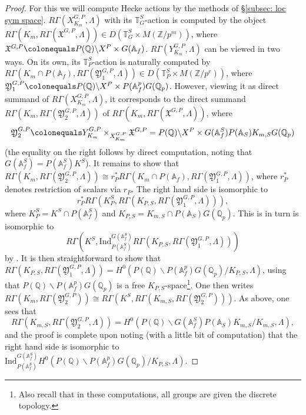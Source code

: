 \documentclass{amsart}
\theoremstyle{remark}
\numberwithin{equation}{subsection}
\newcommand{\A}{\AA}
\newcommand{\Q}{\QQ}
\newcommand{\Z}{\ZZ}
\renewcommand{\AA}{{\mathbb A}}
\newcommand{\QQ}{{\mathbb Q}}
\newcommand{\ZZ}{{\mathbb Z}}
\newcommand{\frakX}{\mathfrak{X}}
\newcommand{\Qp}{\Q_p}
\newcommand{\XGP}[1][m]{X^{G,P}_{K_{#1}}}
\newcommand{\YGP}[1][m]{Y^{G,P}_{K_{#1}}}
\newcommand{\mf}{\mathfrak}
\newcommand{\defeq}{\colonequals}
\renewcommand{\(}{\left(}
\renewcommand{\)}{\right)}
\begin{document}
\begin{proof}
For this we will compute Hecke actions by the methods of \S \ref{subsec: loc sym space}. $R\Gamma(\XGP,\Lambda)$ with its $\mathbb{T}_G^S$-action is computed by the object $R\Gamma(K_m, R\Gamma(\frakX^{G,P},\Lambda))\in D(\mathbb{T}_G^S \times M(\Z/p^m))$, where $\frakX^{G,P} \defeq P(\Q)\backslash X^P \times G(\A_f)$. $R\Gamma(\YGP,\Lambda)$ can be viewed in two ways. On its own, its $\mathbb{T}_P^S$-action is naturally computed by $R\Gamma(K_m\cap P(\A_f), R\Gamma(\mf{Y}_1^{G,P},\Lambda))\in D(\mathbb{T}_P^S \times M(\Z/p^r))$, where $\mf{Y}_1^{G,P} \defeq P(\Q)\backslash X^P \times P(\A_f^p)G(\Qp)$. However, viewing it as direct summand of $R\Gamma(\XGP,\Lambda)$, it corresponds to the direct summand $R\Gamma(K_m, R\Gamma(\mf{Y}_2^{G,P},\Lambda))$ of $R\Gamma(K_m, R\Gamma(\frakX^{G,P},\Lambda))$, where 
\[
\mf{Y}_2^{G,P} \defeq \YGP \times_{\XGP} \mf{X}^{G,P} = P(\Q) \backslash X^P \times G(\A_f^S)P(\A_S)K_{m,S} G(\Qp)
\]
(the equality on the right follows by direct computation, noting that $G(\A_f^S)=P(\A_f^S)K^S$). It remains to show that $R\Gamma(K_m, R\Gamma(\mf{Y}_2^{G,P},\Lambda))\cong r_P^\ast R\Gamma(K_m\cap P(\A_f), R\Gamma(\mf{Y}_1^{G,P},\Lambda))$, where $r_P^\ast$ denotes restriction of scalars via $r_P$. The right hand side is isomorphic to 
\[
r_P^\ast R\Gamma\left( K_P^S, R\Gamma \left( K_{P,S}, R\Gamma(\mf{Y}_1^{G,P},\Lambda)\right) \right),
\]
where $K_P^S = K^S \cap P(\A_f^S)$ and $K_{P,S} = K_{m,S} \cap P(\A_S)G(\Qp)$. This is in turn is isomorphic to 
\[
R\Gamma\left( K^S, \mathrm{Ind}_{P(\A_f^S)}^{G(\A_f^S)} R\Gamma \left( K_{P,S}, R\Gamma(\mf{Y}_1^{G,P},\Lambda)\right) \right)
\]
by \cite[Corollary 2.6]{newton-thorne}. It is then straightforward to show that $R\Gamma(K_{P,S},R\Gamma(\mf{Y}_1^{G,P},\Lambda)) = H^0(P(\Q)\backslash P(\A_f^p)G(\Qp)/K_{P,S}, \Lambda)$, using that $P(\Q)\backslash P(\A_f^p)G(\Qp)$ is a free $K_{P,S}$-space\footnote{Also recall that in these computations, all groups are given the discrete topology.}. One then writes $R\Gamma(K_m, R\Gamma(\mf{Y}_2^{G,P})) \cong R\Gamma(K^S, R\Gamma(K_{m,S},R\Gamma(\mf{Y}_2^{G,P})))$. As above, one sees that
\[
R\Gamma(K_{m,S},R\Gamma(\mf{Y}_2^{G,P},\Lambda)) = H^0(P(\Q)\backslash G(\A_f^S)P(\A_S)K_{m,S}/K_{m,S}, \Lambda),
\]
and the proof is complete upon noting (with a little bit of computation) that the right hand side is isomorphic to $\mathrm{Ind}_{P(\A_f^S)}^{G(\A_f^S)}H^0(P(\Q)\backslash P(\A_f^p)G(\Qp)/K_{P,S}, \Lambda)$.
\end{proof}
\end{document}
